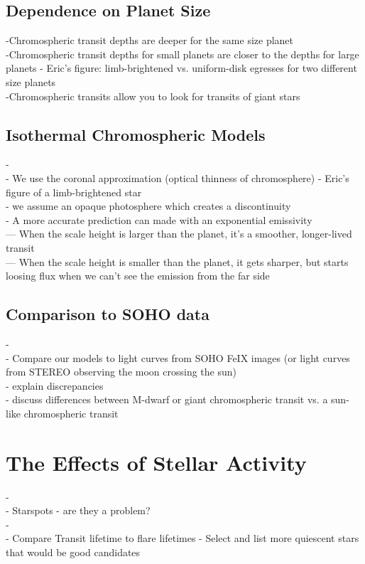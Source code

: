 \documentclass[manuscript]{aastex}
\begin{document}
\subsection{Dependence on Planet Size}
-Chromospheric transit depths are deeper for the same size planet \\
-Chromospheric transit  depths for small planets are closer to the depths for large planets
 - Eric's figure: limb-brightened vs. uniform-disk egresses for two different size planets \\
-Chromospheric transits allow you to look for transits of giant stars \\


\subsection{Isothermal Chromospheric Models}
- \\
- We use the coronal approximation (optical thinness of chromosphere)
- Eric's figure of a limb-brightened star \\
 - we assume an opaque photosphere which creates a discontinuity \\
- A more accurate prediction can made with an exponential emissivity \\
--- When the scale height is larger than the planet, it's a smoother, longer-lived transit \\
--- When the scale height is smaller than the planet, it gets sharper, but starts loosing flux when we can't see the emission from the far side \\


\subsection{Comparison to SOHO data}
-\\
- Compare our models to light curves from SOHO FeIX images
 (or light curves from STEREO observing the moon crossing the sun) \\
- explain discrepancies\\
- discuss differences between M-dwarf or giant chromospheric transit
vs. a sun-like chromospheric transit \\

\section{The Effects of Stellar Activity}\label{labl:stactv}
-\\
-    Starspots - are they a problem? \\
-\\
-    Compare Transit lifetime to flare lifetimes
-  Select and list more quiescent stars that would be good candidates
\end{document}
